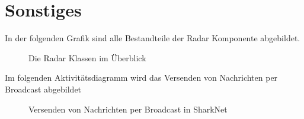 \documentclass[german, 12pt]{book}
\begin{document}
\chapter{Sonstiges}


\newpage

In der folgenden Grafik sind alle Bestandteile der Radar Komponente abgebildet.
\begin{figure}[H]
	\centering
	\hspace*{1cm}
	\caption{Die Radar Klassen im Überblick}
	\label{fig:radarAll}
\end{figure}

\newpage

Im folgenden Aktivitätsdiagramm wird das Versenden von Nachrichten per Broadcast abgebildet
\begin{figure}[H]
	\centering
	\hspace*{1cm}
	\caption{Versenden von Nachrichten per Broadcast in SharkNet}
	\label{fig:broadcastSend}
\end{figure}
\end{document}
